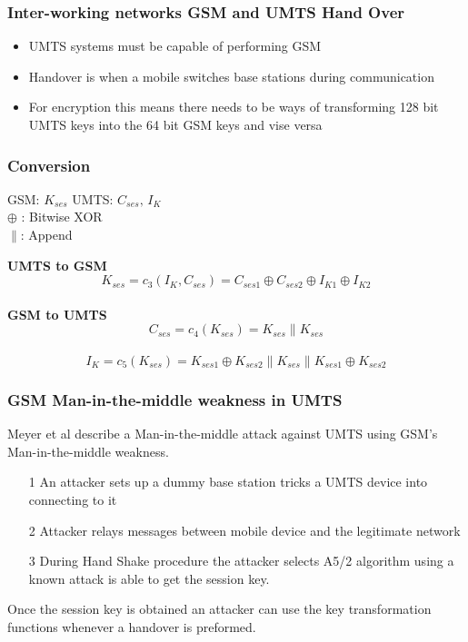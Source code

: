 \documentclass{beamer}
\begin{document}
	\begin{frame}
	
	\frametitle{Inter-working networks GSM and UMTS Hand Over}
	\begin{itemize}
		\item UMTS systems must be capable of performing GSM
		\item Handover is when a mobile switches base stations during communication
		\item For encryption this means there needs to be ways of transforming 128 bit UMTS keys into the 64 bit GSM keys and vise versa
	\end{itemize}
	\end{frame}
	\begin{frame}
		\frametitle{Conversion}
			GSM: $K_{ses}$ \longleftrightarrow UMTS: $C_{ses}\text{, } I_{K}$\\
 			$\oplus$ : Bitwise XOR\\
			$\|$: Append
 \vspace{.5cm}
	
		\textbf{UMTS to GSM}
		\begin{equation}
			\label{C_3}
			\mathit{K_{ses} = c_{3}(I_{K},C_{ses}) = C_{ses1} \oplus 					C_{ses2}\oplus I_{K1} \oplus I_{K2}}
		\end{equation}\\
		\textbf{GSM to UMTS}
		\begin{equation} 
			\label{C_4}
			\mathit{C_{ses} = c_{4}(K_{ses}) = K_{ses} \| K_{ses}}
		\end{equation}\\

		\begin{equation}
			\label{C_5}
			\mathit{I_{K} = c_{5}(K_{ses}) = K_{ses1}\oplus K_{ses2}\|					K_{ses}\|K_{ses1}\oplus K_{ses2}}
		\end{equation}
	
\end{frame}	
		
\begin{frame}
	\frametitle{GSM Man-in-the-middle weakness in UMTS}
	Meyer et al describe a Man-in-the-middle attack against UMTS using GSM's Man-in-the-middle weakness.
	\begin{itemize}
	\item[1] An attacker sets up a dummy base station tricks a UMTS device into connecting to it
	\item[2] Attacker relays messages between mobile device and the legitimate network
	\item[3] During Hand Shake procedure the attacker selects A5/2 algorithm using a known attack is able to get the session key. 
	\end{itemize}
	\vspace{.25cm}Once the session key is obtained an attacker can use the key transformation functions whenever a handover is preformed.
	
	
\end{frame}
\end{document}
